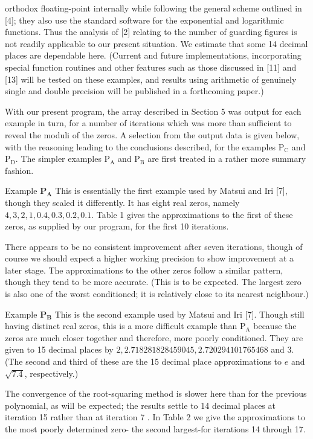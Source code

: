 \documentclass[10pt]{article}
\begin{document}
orthodox floating-point internally while following the general scheme outlined in [4]; they also use the standard software for the exponential and logarithmic functions. Thus the analysis of [2] relating to the number of guarding figures is not readily applicable to our present situation. We estimate that some 14 decimal places are dependable here. (Current and future implementations, incorporating special function routines and other features such as those discussed in [11] and [13] will be tested on these examples, and results using arithmetic of genuinely single and double precision will be published in a forthcoming paper.)

With our present program, the array described in Section 5 was output for each example in turn, for a number of iterations which was more than sufficient to reveal the moduli of the zeros. A selection from the output data is given below, with the reasoning leading to the conclusions described, for the examples $\mathrm{P}_{\mathrm{C}}$ and $\mathrm{P}_{\mathrm{D}}$. The simpler examples $\mathrm{P}_{\mathrm{A}}$ and $\mathrm{P}_{\mathrm{B}}$ are first treated in a rather more summary fashion.

Example $\mathbf{P}_{\mathbf{A}}$ This is essentially the first example used by Matsui and Iri [7], though they scaled it differently. It has eight real zeros, namely $4,3,2,1,0.4,0.3,0.2,0.1$. Table 1 gives the approximations to the first of these zeros, as supplied by our program, for the first 10 iterations.

There appears to be no consistent improvement after seven iterations, though of course we should expect a higher working precision to show improvement at a later stage. The approximations to the other zeros follow a similar pattern, though they tend to be more accurate. (This is to be expected. The largest zero is also one of the worst conditioned; it is relatively close to its nearest neighbour.)

Example $\mathbf{P}_{\mathbf{B}}$ This is the second example used by Matsui and Iri [7]. Though still having distinct real zeros, this is a more difficult example than $\mathrm{P}_{\mathrm{A}}$ because the zeros are much closer together and therefore, more poorly conditioned. They are given to 15 decimal places by $2,2.718281828459045,2.720294101765468$ and 3. (The second and third of these are the 15 decimal place approximations to $e$ and $\sqrt{7.4}$, respectively.)

The convergence of the root-squaring method is slower here than for the previous polynomial, as will be expected; the results settle to 14 decimal places at iteration 15 rather than at iteration 7 . In Table 2 we give the approximations to the most poorly determined zero- the second largest-for iterations 14 through 17.
\end{document}
